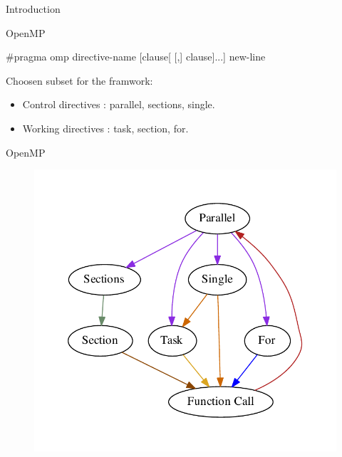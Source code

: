 \documentclass[xcolor=dvipsnames]{beamer}
\begin{document}
\begin{section}{Introduction}
\begin{frame}{\hskip 0.3cm OpenMP }
\begin{block}
$\#$pragma omp directive-name [clause[ [,] clause]...] new-line

\end{block}

Choosen subset for the framwork:

\begin{itemize}

\item Control directives : parallel, sections, single.

\item Working directives : task, section, for.

\end{itemize}

\end{frame}












\begin{frame}{\hskip 0.3cm OpenMP}

\begin{figure}
\centering
\includegraphics[scale = 0.45]{ompstructure}

\end{figure}

\end{frame}



\end{section}
\end{document}

